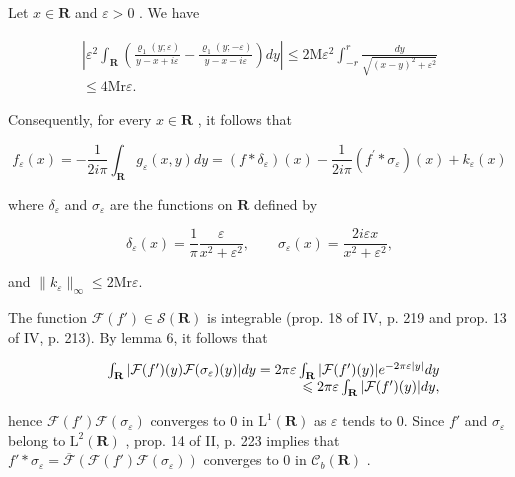 Let \(x \in \mathbf{R}\) and \(\varepsilon > 0\) . We have

\[
\begin{array}{c} \left| \varepsilon^ {2} \int_ {\mathbf {R}} \left(\frac {\varrho_ {1} (y ; \varepsilon)}{y - x + i \varepsilon} - \frac {\varrho_ {1} (y ; - \varepsilon)}{y - x - i \varepsilon}\right) d y \right| \leqslant 2 \mathrm{M} \varepsilon^ {2} \int_ {- r} ^ {r} \frac {d y}{\sqrt {(x - y) ^ {2} + \varepsilon^ {2}}} \\ \leqslant 4 \mathrm{Mr} \varepsilon . \end{array}
\]

Consequently, for every \(x \in \mathbf{R}\) , it follows that

\[
f _ {\varepsilon} (x) = - \frac {1}{2 i \pi} \int_ {\mathbf {R}} g _ {\varepsilon} (x, y) d y = (f * \delta_ {\varepsilon}) (x) - \frac {1}{2 i \pi} (f ^ {\prime} * \sigma_ {\varepsilon}) (x) + k _ {\varepsilon} (x)
\]

where \(\delta_{\varepsilon}\) and \(\sigma_{\varepsilon}\) are the functions on \(\mathbf{R}\) defined by

\[
\delta_ {\varepsilon} (x) = \frac {1}{\pi} \frac {\varepsilon}{x ^ {2} + \varepsilon^ {2}}, \qquad \sigma_ {\varepsilon} (x) = \frac {2 i \varepsilon x}{x ^ {2} + \varepsilon^ {2}},
\]

and \(\| k_{\varepsilon}\|_{\infty}\leqslant 2\mathrm{Mr}\varepsilon .\)

The function \(\mathcal{F}(f') \in \mathcal{S}(\mathbf{R})\) is integrable (prop. 18 of IV, p. 219 and prop. 13 of IV, p. 213). By lemma 6, it follows that

\[
\begin{array}{r l r} & & {\int_ {\mathbf {R}} | \mathcal {F} (f ^ {\prime}) (y) \mathcal {F} (\sigma_ {\varepsilon}) (y) | d y = 2 \pi \varepsilon \int_ {\mathbf {R}} | \mathcal {F} (f ^ {\prime}) (y) | e ^ {- 2 \pi \varepsilon | y |} d y} \\ & & {\leqslant 2 \pi \varepsilon \int_ {\mathbf {R}} | \mathcal {F} (f ^ {\prime}) (y) | d y,} \end{array}
\]

hence \(\mathcal{F}(f')\mathcal{F}(\sigma_{\varepsilon})\) converges to 0 in \(\mathrm{L}^{1}(\mathbf{R})\) as \(\varepsilon\) tends to 0. Since \(f'\) and \(\sigma_{\varepsilon}\) belong to \(\mathrm{L}^{2}(\mathbf{R})\) , prop. 14 of II, p. 223 implies that \(f'*\sigma_{\varepsilon}=\overline{\mathcal{F}}(\mathcal{F}(f')\mathcal{F}(\sigma_{\varepsilon}))\) converges to 0 in \(\mathcal{C}_{b}(\mathbf{R})\) .

